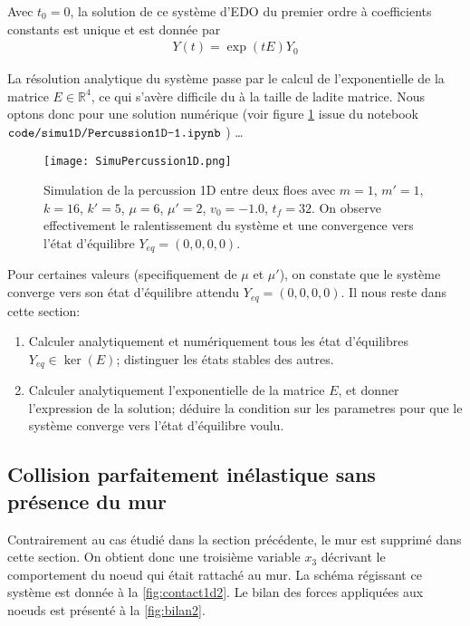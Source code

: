 \noindent Avec $t_0= 0$, la solution de ce système d'EDO du premier ordre à coefficients constants est unique et est donnée par
\begin{align}
    Y(t) = \exp(tE)Y_0
\end{align}

La résolution analytique du système passe par le calcul de l'exponentielle de la matrice $E \in \mathbb{R}^4$, ce qui s'avère difficile du à la taille de ladite matrice. Nous optons donc pour une solution numérique (voir figure \cref{fig:simucontact1d} issue du notebook $\verb|code/simu1D/Percussion1D-1.ipynb|$ ) \ldots
\begin{figure}[!h]
    \centering
    \texttt{[image: SimuPercussion1D.png]}
    \caption{Simulation de la percussion 1D entre deux floes avec $m=1$, $m'=1$, $k=16$, $k'=5$, $\mu=6$,
        $\mu'=2$, $v_0=-1.0$, $t_{f}=32$. On observe effectivement le ralentissement du système et une convergence
        vers l'état d'équilibre $Y_{eq}= (0,0,0,0)$.}
    \label{fig:simucontact1d}
\end{figure}

\noindent Pour certaines valeurs (specifiquement de $\mu$ et $\mu'$), on constate que le système converge vers son état d'équilibre attendu $Y_{eq} = (0,0,0,0)$. Il nous reste dans cette section:
\begin{enumerate}
    \item Calculer analytiquement et numériquement tous les état d'équilibres $Y_{eq} \in \ker(E)$; distinguer les états stables des autres.
    \item Calculer analytiquement l'exponentielle de la matrice $E$, et donner l'expression de la solution; déduire la condition sur les parametres pour que le système converge vers l'état d'équilibre voulu.
\end{enumerate} 








\subsection{Collision parfaitement inélastique sans présence du mur}

Contrairement au cas étudié dans la section précédente, le mur est supprimé dans cette section. On obtient donc une troisième variable $x_3$ décrivant le comportement du noeud qui était rattaché au mur. La schéma régissant ce système est donnée à la \cref{fig:contact1d2}. Le bilan des forces appliquées aux noeuds est présenté à la \cref{fig:bilan2}.

